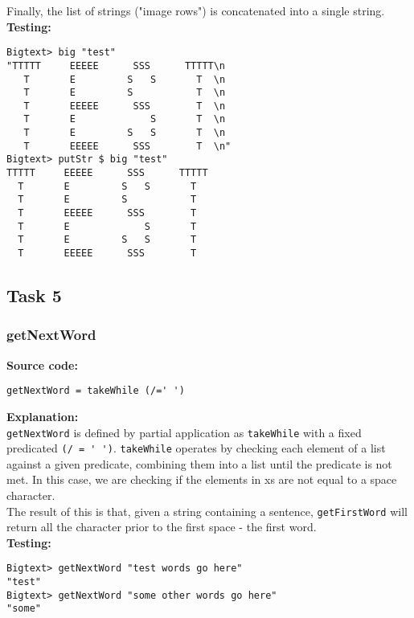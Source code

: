 \documentclass[11pt]{article}
\begin{document}

Finally, the list of strings ("image rows") is concatenated into a single string.\\

\textbf{Testing:}
\begin{verbatim}
Bigtext> big "test"
"TTTTT     EEEEE      SSS      TTTTT\n
   T       E         S   S       T  \n
   T       E         S           T  \n
   T       EEEEE      SSS        T  \n
   T       E             S       T  \n
   T       E         S   S       T  \n
   T       EEEEE      SSS        T  \n"
Bigtext> putStr $ big "test"
TTTTT     EEEEE      SSS      TTTTT
  T       E         S   S       T  
  T       E         S           T  
  T       EEEEE      SSS        T  
  T       E             S       T  
  T       E         S   S       T  
  T       EEEEE      SSS        T  

\end{verbatim}


\newpage
\subsection{Task 5}
\subsubsection{getNextWord}
\textbf{Source code:}
\begin{verbatim}
getNextWord = takeWhile (/=' ')
\end{verbatim}

\textbf{Explanation:}\\
{\verb|getNextWord|} is defined by partial application as {\verb|takeWhile|} with a fixed predicated {\verb|(/ = ' ')|}. {\verb|takeWhile|} operates by checking each element of a list against a given predicate, combining them into a list until the predicate is not met. In this case, we are checking if the elements in xs are not equal to a space character. \\

The result of this is that, given a string containing a sentence, {\verb|getFirstWord|} will return all the character prior to the first space - the first word.\\

\textbf{Testing:}
\begin{verbatim}
Bigtext> getNextWord "test words go here"
"test"
Bigtext> getNextWord "some other words go here"
"some"
\end{verbatim}
\end{document}
